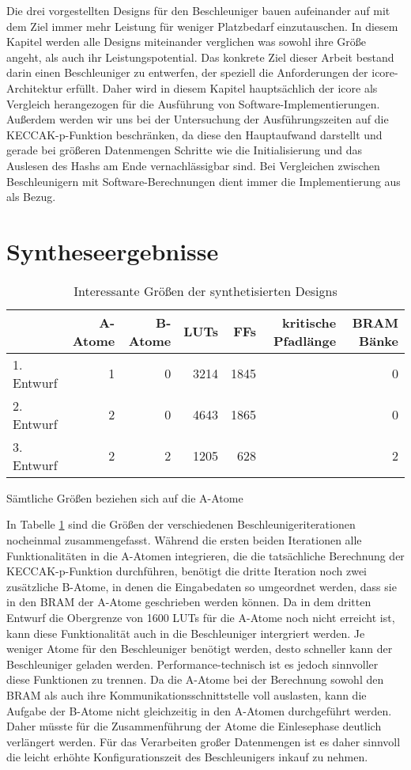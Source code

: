 Die drei vorgestellten Designs für den Beschleuniger bauen aufeinander auf mit dem Ziel immer mehr Leistung für weniger Platzbedarf einzutauschen.
In diesem Kapitel werden alle Designs miteinander verglichen was sowohl ihre Größe angeht, als auch ihr Leistungspotential.
Das konkrete Ziel dieser Arbeit bestand darin einen Beschleuniger zu entwerfen, der speziell die Anforderungen der icore-Architektur erfüllt.
Daher wird in diesem Kapitel hauptsächlich der icore als Vergleich herangezogen für die Ausführung von Software-Implementierungen.
Außerdem werden wir uns bei der Untersuchung der Ausführungszeiten auf die KECCAK-p-Funktion beschränken,
da diese den Hauptaufwand darstellt und gerade bei größeren Datenmengen Schritte wie die Initialisierung und das Auslesen des Hashs am Ende vernachlässigbar sind.
Bei Vergleichen zwischen Beschleunigern mit Software-Berechnungen dient immer die Implementierung aus  als Bezug.


\section{Syntheseergebnisse}
\begin{table}
    \centering
    \begin{tabular}{lrrrrrr}
    & A-Atome & B-Atome & LUTs & FFs & kritische Pfadlänge & BRAM Bänke \\
    \hline
    1. Entwurf & 1 & 0 & 3214 & 1845 & \comment{?} & 0 \\
    2. Entwurf & 2 & 0 & 4643 & 1865 & \comment{?} & 0 \\
    3. Entwurf & 2 & 2 & 1205 & 628 & \comment{?} & 2
    \end{tabular}
    \label{tab:synth_ergebniss}
    \caption{Interessante Größen der synthetisierten Designs}
    \small
    Sämtliche Größen beziehen sich auf die A-Atome
\end{table}
In Tabelle \ref{tab:synth_ergebniss} sind die Größen der verschiedenen Beschleunigeriterationen nocheinmal zusammengefasst.
Während die ersten beiden Iterationen alle Funktionalitäten in die A-Atomen integrieren, die die tatsächliche Berechnung der KECCAK-p-Funktion durchführen,
benötigt die dritte Iteration noch zwei zusätzliche B-Atome, in denen die Eingabedaten so umgeordnet werden, dass sie in den BRAM der A-Atome geschrieben werden können.
Da in dem dritten Entwurf die Obergrenze von 1600 LUTs für die A-Atome noch nicht erreicht ist, kann diese Funktionalität auch in die Beschleuniger intergriert werden.
Je weniger Atome für den Beschleuniger benötigt werden, desto schneller kann der Beschleuniger geladen werden.
Performance-technisch ist es jedoch sinnvoller diese Funktionen zu trennen. Da die A-Atome bei der Berechnung sowohl den BRAM als auch ihre Kommunikationsschnittstelle
voll auslasten, kann die Aufgabe der B-Atome nicht gleichzeitig in den A-Atomen durchgeführt werden. Daher müsste für die Zusammenführung der Atome die Einlesephase deutlich verlängert werden.
Für das Verarbeiten großer Datenmengen ist es daher sinnvoll die leicht erhöhte Konfigurationszeit des Beschleunigers inkauf zu nehmen.

